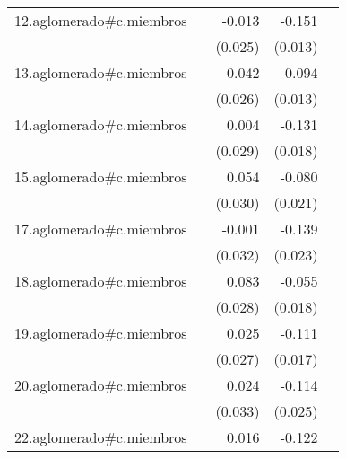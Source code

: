 {\begin{longtable}{l*{4}{D{.}{.}{-1}}}
\addlinespace
12.aglomerado#c.miembros&                     &      -0.013         &      -0.151\sym{***}&                     \\
            &                     &     (0.025)         &     (0.013)         &                     \\
\addlinespace
13.aglomerado#c.miembros&                     &       0.042         &      -0.094\sym{***}&                     \\
            &                     &     (0.026)         &     (0.013)         &                     \\
\addlinespace
14.aglomerado#c.miembros&                     &       0.004         &      -0.131\sym{***}&                     \\
            &                     &     (0.029)         &     (0.018)         &                     \\
\addlinespace
15.aglomerado#c.miembros&                     &       0.054         &      -0.080\sym{***}&                     \\
            &                     &     (0.030)         &     (0.021)         &                     \\
\addlinespace
17.aglomerado#c.miembros&                     &      -0.001         &      -0.139\sym{***}&                     \\
            &                     &     (0.032)         &     (0.023)         &                     \\
\addlinespace
18.aglomerado#c.miembros&                     &       0.083\sym{**} &      -0.055\sym{**} &                     \\
            &                     &     (0.028)         &     (0.018)         &                     \\
\addlinespace
19.aglomerado#c.miembros&                     &       0.025         &      -0.111\sym{***}&                     \\
            &                     &     (0.027)         &     (0.017)         &                     \\
\addlinespace
20.aglomerado#c.miembros&                     &       0.024         &      -0.114\sym{***}&                     \\
            &                     &     (0.033)         &     (0.025)         &                     \\
\addlinespace
22.aglomerado#c.miembros&                     &       0.016         &      -0.122\sym{***}&                     \\

\end{longtable}}

